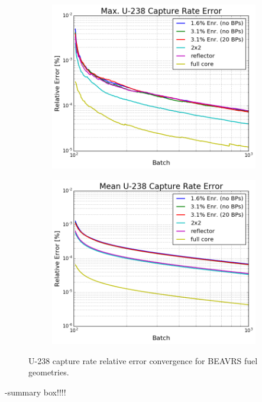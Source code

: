 \begin{figure}[h!]
\centering
\begin{subfigure}{\textwidth}
  \centering
  \includegraphics[width=0.8\linewidth]{figures/benchmarks/capture-rates/capt-conv-max-assms}
  \caption{}
  \label{fig:chap7-capt-rate-max-conv}
\end{subfigure}
\begin{subfigure}{\textwidth}
  \centering
  \includegraphics[width=0.8\linewidth]{figures/benchmarks/capture-rates/capt-conv-mean-assms}
  \caption{}
  \label{fig:chap7-capt-rate-max-conv}
\end{subfigure}
\caption[U-238 capture rate error convergence for BEAVRS geometries]{U-238 capture rate relative error convergence for \ac{BEAVRS} fuel geometries.}
\label{fig:chap7-capt-rates-conv}
\end{figure}


-summary box!!!!